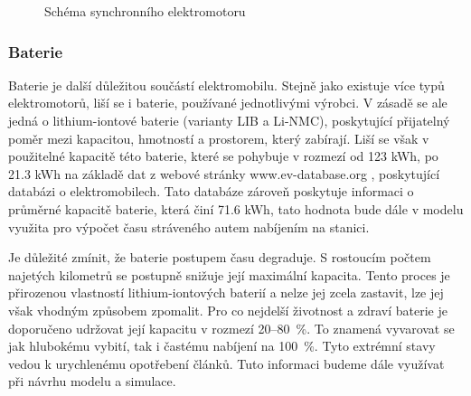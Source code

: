 \documentclass[a4paper,11pt]{article}
\begin{document}
\begin{figure}[H]
    \centering
    \caption{Schéma synchronního elektromotoru \cite{elektromotor}}
    \label{figure:synchroni-elektromotor}
\end{figure}

\subsubsection{Baterie}

\label{batteries}
Baterie je další důležitou součástí elektromobilu. Stejně jako existuje více typů elektromotorů, 
liší se i baterie, používané jednotlivými výrobci. V zásadě se ale jedná o lithium-iontové baterie
(varianty LIB a Li-NMC), poskytující přijatelný poměr mezi kapacitou, hmotností a prostorem, který 
zabírají.\cite{baterie_ev_wiki} Liší se však v použitelné kapacitě této baterie, které se pohybuje 
v rozmezí od 123 kWh, po 21.3 kWh na základě dat z webové stránky www.ev-database.org \cite{ev_database}, 
poskytující databázi o elektromobilech. Tato databáze zároveň poskytuje informaci o průměrné kapacitě
baterie, která činí 71.6 kWh, tato hodnota bude dále v modelu využita pro výpočet času stráveného autem
nabíjením na stanici.

Je důležité zmínit, že baterie postupem času degraduje. S rostoucím počtem najetých kilometrů se postupně snižuje její maximální kapacita. Tento proces je přirozenou vlastností lithium-iontových baterií a nelze jej zcela zastavit, lze jej však vhodným způsobem zpomalit. Pro co nejdelší životnost a zdraví baterie je doporučeno udržovat její kapacitu v rozmezí 20–80~\%. To znamená vyvarovat se jak hlubokému vybití, tak i častému nabíjení na 100~\%. Tyto extrémní stavy vedou k urychlenému opotřebení článků. Tuto informaci budeme dále využívat při návrhu modelu a simulace.\cite{battery-health}
\end{document}
